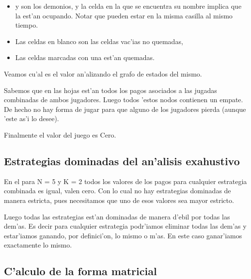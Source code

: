 \begin{itemize}
\item {} y  son los demonios, y la celda en la que se encuentra su nombre implica que la est'an ocupando. Notar que pueden estar en la misma casilla al mismo tiempo.
\item Las celdas en blanco son las celdas vac'ias no quemadas,
\item Las celdas marcadas con una  est'an quemadas.
\end{itemize}


Veamos cu'al es el valor an'alizando el grafo de estados del mismo.

Sabemos que en las hojas est'an todos los pagos asociados a las jugadas combinadas de ambos jugadores. Luego todos 'estos nodos contienen un empate. De hecho no hay forma de jugar para que alguno de los jugadores pierda (aunque 'este as'i lo desee).

Finalmente el valor del juego es Cero.


\subsection{Estrategias dominadas del an'alisis exahustivo}
En el  para N = 5 y K = 2 todos los valores de los pagos para cualquier estrategia combinada es igual, valen cero. Con lo cual no hay estrategias dominadas de manera estricta, pues necesitamos que uno de esos valores sea mayor estricto.

Luego todas las estrategias est'an dominadas de manera d'ebil por todas las dem'as. Es decir para cualquier estrategia podr'iamos eliminar todas las dem'as y estar'iamos ganando, por definici'on, lo mismo o m'as. En este caso ganar'iamos exactamente lo mismo.


\subsection{C'alculo de la forma matricial}


